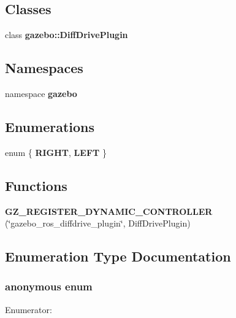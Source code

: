 \subsection*{Classes}
\begin{DoxyCompactItemize}
\item 
class {\bf gazebo::DiffDrivePlugin}
\end{DoxyCompactItemize}
\subsection*{Namespaces}
\begin{DoxyCompactItemize}
\item 
namespace {\bf gazebo}
\end{DoxyCompactItemize}
\subsection*{Enumerations}
\begin{DoxyCompactItemize}
\item 
enum \{ {\bf RIGHT}, 
{\bf LEFT}
 \}
\end{DoxyCompactItemize}
\subsection*{Functions}
\begin{DoxyCompactItemize}
\item 
{\bf GZ\_\-REGISTER\_\-DYNAMIC\_\-CONTROLLER} (\char`\"{}gazebo\_\-ros\_\-diffdrive\_\-plugin\char`\"{}, DiffDrivePlugin)
\end{DoxyCompactItemize}


\subsection{Enumeration Type Documentation}
\subsubsection[{"@0}]{\setlength{\rightskip}{0pt plus 5cm}anonymous enum}\label{gazebo__ros__diffdrive__plugin_8cpp_a06fc87d81c62e9abb8790b6e5713c55b}
\begin{Desc}
\item[Enumerator: ]\par
\begin{description}
\item[{\em 
RIGHT\label{gazebo__ros__diffdrive__plugin_8cpp_a06fc87d81c62e9abb8790b6e5713c55baec8379af7490bb9eaaf579cf17876f38}
}]\item[{\em 
LEFT\label{gazebo__ros__diffdrive__plugin_8cpp_a06fc87d81c62e9abb8790b6e5713c55badb45120aafd37a973140edee24708065}
}]\end{description}
\end{Desc}



